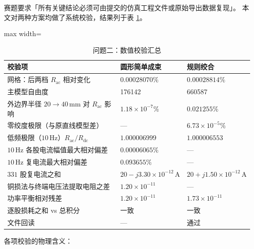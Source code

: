 \documentclass[12pt, a4paper]{ctexart}
\newcommand{\Rac}{R_{\mathrm{ac}}}
\newcommand{\Rdc}{R_{\mathrm{dc}}}
\newcommand{\U}[1]{\ensuremath{\,\mathrm{#1}}}
\begin{document}
赛题要求「所有关键结论必须可由提交的仿真工程文件或原始导出数据复现」。
本文对两种方案均做了系统校验，结果列于表 \ref{tab:q2-verify}。

\begin{table}[H]
\centering
\caption{问题二：数值校验汇总}
\label{tab:q2-verify}
\small
\begin{adjustbox}{max width=\textwidth}
\begin{tabular}{l l l}
\toprule
\textbf{校验项} & \textbf{圆形简单成束} & \textbf{规则绞合} \\
\midrule
网格：后两档 $\Rac$ 相对变化 & $0.00028070\%$ & $0.00028814\%$ \\
主模型自由度                 & 176142 & 660587 \\
外边界半径 $20\to40\U{mm}$ 对 $\Rac$ 影响 & $1.18\times10^{-7}\%$ & $0.021255\%$ \\
零绞度极限（与原直线模型差） & --- & $6.73\times10^{-5}\%$ \\
低频极限（$10\U{Hz}$）$\Rac/\Rdc$ & $1.000006999$ & $1.000006553$ \\
$10\U{Hz}$ 各股电流幅值最大相对偏差 & $0.00006065\%$ & --- \\
$10\U{Hz}$ 复电流最大相对偏差 & $0.093655\%$ & --- \\
$331$ 股复电流之和           & $20 - j3.30\times10^{-12}\U{A}$ & $20 + j1.50\times10^{-12}\U{A}$ \\
铜损法与终端电压法提取电阻之差 & $1.20\times10^{-11}$ & --- \\
功率平衡相对残差             & $1.20\times10^{-11}$ & $1.73\times10^{-11}$ \\
逐股损耗之和 vs 总积分       & 一致 & 一致 \\
文件回读                     & --- & 通过 \\
\bottomrule
\end{tabular}
\end{adjustbox}
\end{table}

各项校验的物理含义：
\end{document}

